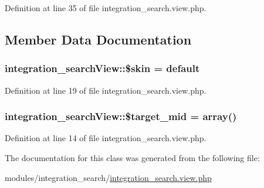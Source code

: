 Definition at line 35 of file integration\+\_\+search.\+view.\+php.



\subsection{Member Data Documentation}
\subsubsection[{\texorpdfstring{\$skin}{$skin}}]{\setlength{\rightskip}{0pt plus 5cm}integration\+\_\+search\+View\+::\$skin = \textquotesingle{}default\textquotesingle{}}\hypertarget{classintegration__searchView_a4281fc0752039ec4025ddaca5771f074}{}\label{classintegration__searchView_a4281fc0752039ec4025ddaca5771f074}


Definition at line 19 of file integration\+\_\+search.\+view.\+php.

\subsubsection[{\texorpdfstring{\$target\+\_\+mid}{$target_mid}}]{\setlength{\rightskip}{0pt plus 5cm}integration\+\_\+search\+View\+::\$target\+\_\+mid = array()}\hypertarget{classintegration__searchView_a17efafd7259acddb90e2c181bcfeaa38}{}\label{classintegration__searchView_a17efafd7259acddb90e2c181bcfeaa38}


Definition at line 14 of file integration\+\_\+search.\+view.\+php.



The documentation for this class was generated from the following file\+:\begin{DoxyCompactItemize}
\item 
modules/integration\+\_\+search/\hyperlink{integration__search_8view_8php}{integration\+\_\+search.\+view.\+php}\end{DoxyCompactItemize}
